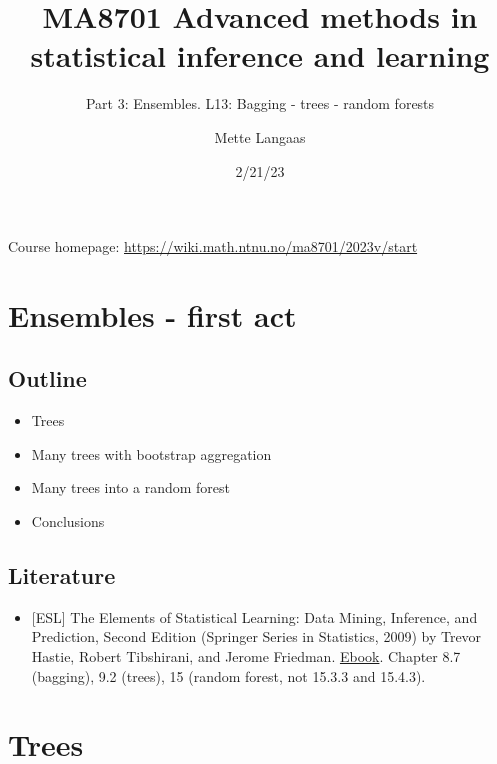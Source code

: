\documentclass[
  letterpaper,
  DIV=11,
  numbers=noendperiod]{scrartcl}
\title{MA8701 Advanced methods in statistical inference and learning}
\subtitle{Part 3: Ensembles. L13: Bagging - trees - random forests}
\author{Mette Langaas}
\date{2/21/23}
\providecommand{\tightlist}{%
  \setlength{\itemsep}{0pt}\setlength{\parskip}{0pt}}\usepackage{longtable,booktabs,array}
\renewcommand*\contentsname{Table of contents}
\newcommand\contentsname{Table of contents}
\begin{document}
\maketitle
\ifdefined\Shaded\renewenvironment{Shaded}{\begin{tcolorbox}[interior hidden, frame hidden, sharp corners, breakable, enhanced, borderline west={3pt}{0pt}{shadecolor}, boxrule=0pt]}{\end{tcolorbox}}\fi

\renewcommand*\contentsname{Table of contents}
{
\hypersetup{linkcolor=}
\setcounter{tocdepth}{3}
\tableofcontents
}
Course homepage: \url{https://wiki.math.ntnu.no/ma8701/2023v/start}

\hypertarget{ensembles---first-act}{%
\section{Ensembles - first act}\label{ensembles---first-act}}

\hypertarget{outline}{%
\subsection{Outline}\label{outline}}

\begin{itemize}
\tightlist
\item
  Trees
\item
  Many trees with bootstrap aggregation
\item
  Many trees into a random forest
\item
  Conclusions
\end{itemize}

\hypertarget{literature}{%
\subsection{Literature}\label{literature}}

\begin{itemize}
\tightlist
\item
  {[}ESL{]} The Elements of Statistical Learning: Data Mining,
  Inference, and Prediction, Second Edition (Springer Series in
  Statistics, 2009) by Trevor Hastie, Robert Tibshirani, and Jerome
  Friedman.
  \href{https://hastie.su.domains/ElemStatLearn/download.html}{Ebook}.
  Chapter 8.7 (bagging), 9.2 (trees), 15 (random forest, not 15.3.3 and
  15.4.3).
\end{itemize}

\hypertarget{trees}{%
\section{Trees}\label{trees}}
\end{document}

